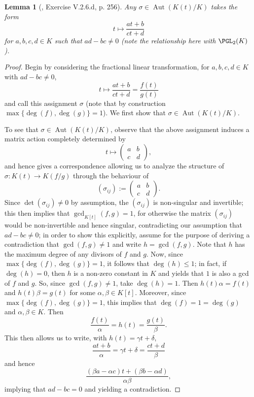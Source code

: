 \documentclass[10pt]{article}
\newtheorem{Lemma}[Theorem]{Lemma}
\DeclareMathOperator{\aut}{Aut}
\DeclareMathOperator{\aut}{rank}
\numberwithin{Theorem}{section}
\begin{document}
\begin{Lemma}[\cite{Hungerford}, Exercise V.2.6.d, p. 256]
Any $\sigma \in \aut(K(t)/K)$ takes the form
$$ t \mapsto \frac{at + b}{ct + d}$$
for $a,b,c,d \in K$ such that $ad - bc \ne 0$ (note the relationship here with $\PGL_2(K)$).
\end{Lemma}
\begin{proof}
Begin by considering the fractional linear transformation, for $a,b,c,d \in K$ with $ad - bc \ne 0$,
$$ t \mapsto \frac{at + b}{ct + d} = \frac{f(t)}{g(t)} $$
and call this assignment $\sigma$ (note that by construction $\max\lbrace \deg(f), \deg(g) \rbrace = 1$). We first show that $\sigma \in \aut(K(t)/K).$ 

To see that $\sigma \in \aut(K(t)/K)$, observe that the above assignment induces a matrix action completely determined by
$$ t \mapsto \begin{pmatrix}
a & b \\
c & d
\end{pmatrix},$$
and hence gives a correspondence allowing us to analyze the structure of $\sigma: K(t) \to K(f/g)$ through the behaviour of
\[
(\sigma_{ij}) := \begin{pmatrix}
a & b \\
c & d
\end{pmatrix}.
\]
Since $\det(\sigma_{ij}) \ne 0$ by assumption, the $(\sigma_{ij})$ is non-singular and invertible; this then implies that $\gcd_{K[t]}(f,g) = 1$, for otherwise the matrix $(\sigma_{ij})$ would be non-invertible and hence singular, contradicting our assumption that $ad - bc \ne 0$; in order to show this explicitly, assume for the purpose of deriving a contradiction that $\gcd(f,g) \ne 1$ and write $h = \gcd(f,g)$. Note that $h$ has the maximum degree of any divisors of $f$ and $g$. Now, since $\max\lbrace \deg(f), \deg(g)\rbrace = 1$, it follows that $\deg(h) \leq 1$; in fact, if $\deg(h) = 0$, then $h$ is a non-zero constant in $K$ and yields that $1$ is also a gcd of $f$ and $g$. So, since $\gcd(f,g) \ne 1$, take $\deg(h) = 1$. Then $h(t)\alpha = f(t)$ and $h(t)\beta = g(t)$ for some $\alpha,\beta \in K[t]$. Moreover, since $\max\lbrace \deg(f), \deg(g)\rbrace = 1$, this implies that $\deg(f) = 1 = \deg(g)$ and $\alpha, \beta \in K$. Then
$$ \frac{f(t)}{\alpha} = h(t) = \frac{g(t)}{\beta}.$$ This then allows us to write, with $h(t) = \gamma t+ \delta$,  
$$ \frac{at + b}{\alpha} =\gamma t + \delta = \frac{ct + d}{\beta}$$
and hence
$$ \frac{(\beta a - \alpha c)t + (\beta b - \alpha d)}{\alpha\beta},$$
implying that $ad - bc = 0$ and yielding a contradiction. 


\end{proof}
\end{document}
